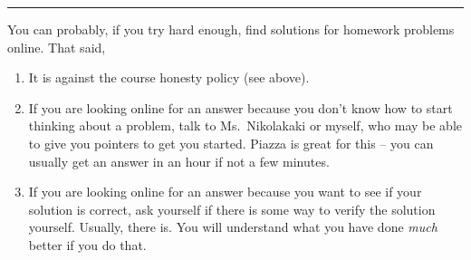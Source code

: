 \documentclass[11pt]{article}
\begin{document}
\vspace{0.3in} 
  \rule{3in}{0.5pt}





\vspace{1in}





You can probably, if you try hard enough, find solutions for homework
problems online. That said,
\begin{enumerate}

\item It is against the course honesty policy (see above). 
\item If you are looking online for an answer because you don't know how
  to start thinking about a problem, talk to Ms.\ Nikolakaki or myself, who may be
  able to give you pointers to get you started.  Piazza is great for
  this -- you can usually get an answer in an hour if not a few minutes.
\item If you are looking online for an answer because you want to see if
  your solution is correct, ask yourself if there is some way to verify
  the solution yourself.   Usually, there is.  You will understand what you have done
  \emph{much} better if you do that.
\end{enumerate}
\end{document}
